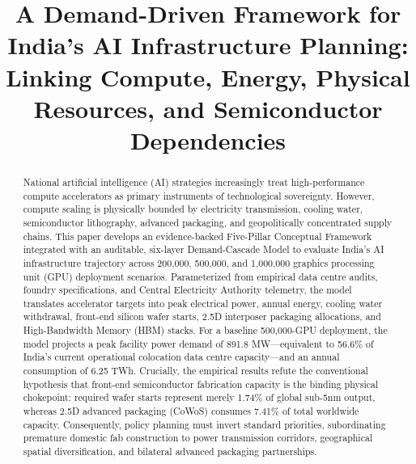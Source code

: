 \documentclass[conference]{IEEEtran}
\begin{document}
\title{A Demand-Driven Framework for India's AI Infrastructure Planning: Linking Compute, Energy, Physical Resources, and Semiconductor Dependencies}

\author{
}

\maketitle

\begin{abstract}
National artificial intelligence (AI) strategies increasingly treat high-performance compute accelerators as primary instruments of technological sovereignty. However, compute scaling is physically bounded by electricity transmission, cooling water, semiconductor lithography, advanced packaging, and geopolitically concentrated supply chains. This paper develops an evidence-backed Five-Pillar Conceptual Framework integrated with an auditable, six-layer Demand-Cascade Model to evaluate India's AI infrastructure trajectory across 200,000, 500,000, and 1,000,000 graphics processing unit (GPU) deployment scenarios. Parameterized from empirical data centre audits, foundry specifications, and Central Electricity Authority telemetry, the model translates accelerator targets into peak electrical power, annual energy, cooling water withdrawal, front-end silicon wafer starts, 2.5D interposer packaging allocations, and High-Bandwidth Memory (HBM) stacks. For a baseline 500,000-GPU deployment, the model projects a peak facility power demand of 891.8 MW---equivalent to 56.6\% of India's current operational colocation data centre capacity---and an annual consumption of 6.25 TWh. Crucially, the empirical results refute the conventional hypothesis that front-end semiconductor fabrication capacity is the binding physical chokepoint: required wafer starts represent merely 1.74\% of global sub-5nm output, whereas 2.5D advanced packaging (CoWoS) consumes 7.41\% of total worldwide capacity. Consequently, policy planning must invert standard priorities, subordinating premature domestic fab construction to power transmission corridors, geographical spatial diversification, and bilateral advanced packaging partnerships.
\end{abstract}
\end{document}
